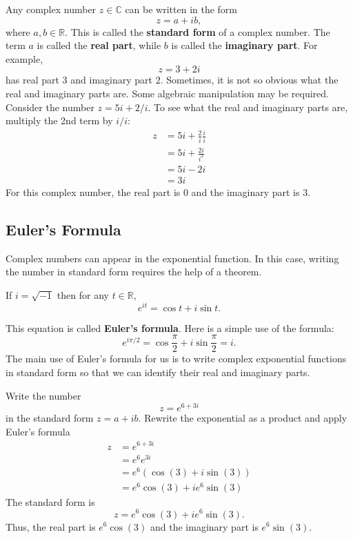 \documentclass[10pt,letterpaper]{article}
\begin{document}
Any complex number $z\in\mathbb{C}$ can be written in the form
\[
z=a+ib,
\]
where $a,b\in\mathbb{R}$. This is called the \textbf{standard form}
of a complex number. The term $a$ is called the \textbf{real part}, while $b$ is called the
\textbf{imaginary part}. For example,
\[
z=3+2i
\]
has real part $3$ and imaginary part $2$. Sometimes, it is not so obvious what the real and imaginary parts are. Some algebraic manipulation may be required. Consider the number $z=5i+2/i$. To see what the real and imaginary parts are, multiply the 2nd term by $i/i$:
\begin{align*}
    z &= 5i+\frac{2}{i}\frac{i}{i}\\
     &= 5i+\frac{2i}{i^2}\\
     &= 5i-2i\\
     &= 3i
\end{align*}
For this complex number, the real part is $0$ and the imaginary part is $3$. 
    

\subsection{Euler's Formula}
Complex numbers can appear in the exponential function. In this case, writing the number in standard form requires the help of a theorem.

\begin{theorem}
If $i=\sqrt{-1}$ then for any $t\in\mathbb{R}$,
\[
e^{it}=\cos t+i\sin t.
\]
\end{theorem}

This equation is called \textbf{Euler's formula}. Here is a simple use of the formula:
\[
e^{i\pi/2}
=
\cos\frac{\pi}{2}
+i\sin\frac{\pi}{2}
=i.
\]
The main use of Euler's formula for us is to write complex exponential functions in standard form so that we can identify their real and imaginary parts.


\begin{example}[6]{
Write the number
$$
z = e^{6+3i}
$$
in the standard form $z=a+ib$.
}
Rewrite the exponential as a product and apply Euler's formula
\begin{align*}
z &= e^{6+3i}\\
 &= e^6e^{3i}\\
 &= e^6(\cos(3)+i\sin(3))\\
 &= e^6\cos(3)+ie^6\sin(3)
\end{align*}
The standard form is 
$$
    \boxed{z=e^6\cos(3)+ie^6\sin(3).}
$$
Thus, the real part is $e^6\cos(3)$ and the imaginary part is $e^6\sin(3).$
\end{example}
\end{document}
